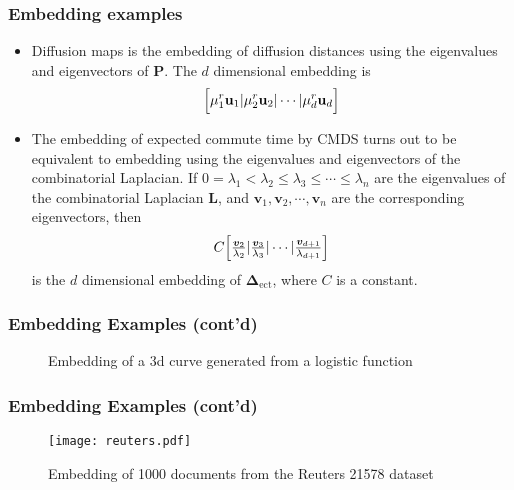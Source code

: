 \documentclass[professionalfonts,hyperref={pdfpagelabels=false,colorlinks=true,linkcolor=red}]{beamer}
\begin{document}
\begin{frame}
  \frametitle{Embedding examples}
  \begin{itemize}
    \item<1-> Diffusion maps \cite{coifman06:_diffus_maps} is the
      embedding of diffusion distances using the eigenvalues and
      eigenvectors of $\mathbf{P}$. The $d$ dimensional embedding is
      \begin{equation*}
        \Bigl[ \mu_1^{r} \mathbf{u}_1 | \mu_{2}^{r} \mathbf{u}_2 |
        \cdots | \mu_{d}^{r}  \mathbf{u}_d \Bigr]
      \end{equation*}
    \item<2> The embedding of expected commute time by CMDS turns out
      to be equivalent to embedding using the eigenvalues and
      eigenvectors of the combinatorial
      Laplacian. If $0 = \lambda_1 < \lambda_2 \leq \lambda_3 \leq \cdots
      \leq \lambda_{n}$ are the eigenvalues of the combinatorial
      Laplacian $\mathbf{L}$, and $\bm{v}_1, \bm{v}_2, \cdots,
      \bm{v}_n$ are the corresponding eigenvectors, then
      \begin{equation}
        \label{eq:1}
        C \Bigl[ \tfrac{\bm{v}_{2}}{\lambda_2} |
        \tfrac{\bm{v}_3}{\lambda_3}
        | \cdots | \tfrac{\bm{v}_{d+1}}{\lambda_{d+1}} \Bigr]
      \end{equation}
      is the $d$ dimensional embedding of
      $\bm{\Delta}_{\mathrm{ect}}$, where $C$ is a constant.  
  \end{itemize}
\end{frame}

\begin{frame}
\frametitle{Embedding Examples (cont'd)}
  \subfiglabelskip=0pt
  \begin{figure}[htbp]
    \label{fig:logistic}
    \centering
    \hspace{3pt}
    \caption{Embedding of a 3d curve generated from a logistic function}
  \end{figure}

\end{frame}

\begin{frame}
\frametitle{Embedding Examples (cont'd)}
  \begin{figure}[htbp]
    \label{fig:reuter}
     \texttt{[image: reuters.pdf]}
    \caption{Embedding of 1000 documents from the Reuters 21578 dataset}
  \end{figure}
\end{frame}
\end{document}
